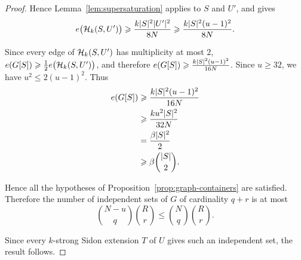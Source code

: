 \documentclass[reqno,a4paper,12pt]{amsart}
\begin{document}
\begin{proof}
    Hence Lemma~\ref{lem:supersaturation} applies to \(S\) and \(U'\),
    and gives
    \[
        e\bigl(\mathcal{H}_k(S,U')\bigr)
        \geqslant
        \frac{k\lvert S\rvert^2\lvert U'\rvert^2}{8N}
        \geqslant
        \frac{k\lvert S\rvert^2(u-1)^2}{8N}.
    \]

    Since every edge of \(\mathcal{H}_k(S,U')\) has multiplicity at most \(2\),
    \(e(G[S])\geqslant\frac12 e\bigl(\mathcal{H}_k(S,U')\bigr)\),
    and therefore \(e(G[S])\geqslant\frac{k\lvert S\rvert^2(u-1)^2}{16N}\).
    Since \(u\geq32\), we have \(u^2\leq2(u-1)^2\).
    Thus
    \begin{align*}
        e(G[S])
         & \geqslant
        \frac{k\lvert S\rvert^2(u-1)^2}{16N} \\
         & \geqslant
        \frac{ku^2\lvert S\rvert^2}{32N}     \\
         & =
        \frac{\beta\lvert S\rvert^2}{2}      \\
         & \geqslant
        \beta\binom{\lvert S\rvert}{2}.
    \end{align*}

    Hence all the hypotheses of
    Proposition~\ref{prop:graph-containers} are satisfied. Therefore
    the number of independent sets of \(G\) of cardinality \(q+r\) is
    at most
    \[
        \binom{N-u}{q}\binom Rr
        \leq
        \binom Nq\binom Rr.
    \]

    Since every \(k\)-strong Sidon extension \(T\) of \(U\) gives such
    an independent set, the result follows.
\end{proof}
\end{document}

